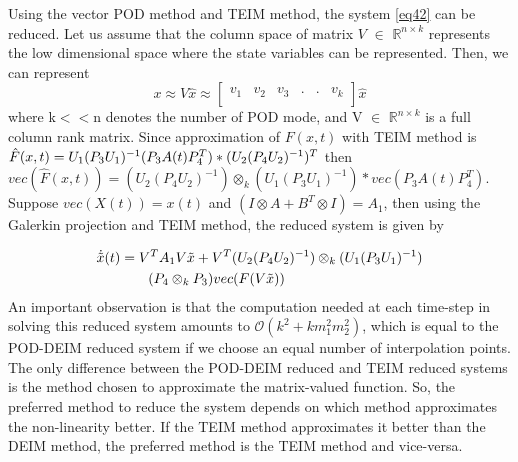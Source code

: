 \documentclass{article}
\begin{document}
Using the vector POD method \cite{Antoulas} and TEIM method, the system \eqref{eq42} can be reduced. Let us assume that the column space of matrix $V$ $\in$ $\mathbb{R}^{n \times k}$ represents the low dimensional space where the state variables can be represented. Then, we can represent 
\begin{equation} \label{eq3}
x \approx V\hat{x} \approx \begin{bmatrix}
v_1 & v_2 & v_3 &.&.& v_k\\
\end{bmatrix}\hat{x}
\end{equation}
where k$<<$n denotes the number of POD mode, and V $\in$ $\mathbb{R}^{n\times k}$ is a full column rank matrix. Since approximation of $F(x,t)$ with TEIM method is $\hat{F}(x,t)=U_1(P_3U_1)^{-1}\\(P_3A(t)P_4^T)*(U_2(P_4U_2)^{-1})^T$ then $vec(\hat{F}(x,t))=(U_2(P_4U_2)^{-1}) \otimes_k (U_1(P_3U_1)^{-1})* vec(P_3A(t)P_4^T)$. Suppose $vec(X(t))=x(t)$ and  $(I \otimes A + B^T \otimes I)=A_1$, then using the Galerkin projection and TEIM method, the reduced system is given by

\begin{equation}
    \begin{split}
        \Dot{\Tilde{x}}(t)&= V^TA_1V\Tilde{x}+V^T(U_2(P_4U_2)^{-1}) \otimes_k (U_1(P_3U_1)^{-1})\\
                      & \quad \quad(P_4 \otimes_k P_3)vec(F(V\Tilde{x}))
    \end{split}
\end{equation} 
An important observation is that the computation needed at each time-step in solving this reduced system amounts to $\mathcal{O}(k^2+km_1^2m_2^2)$, which is equal to the POD-DEIM reduced system if we choose an equal number of interpolation points. The only difference between the POD-DEIM reduced and TEIM reduced systems is the method chosen to approximate the matrix-valued function. So, the preferred method to reduce the system depends on which method approximates the non-linearity better. If the TEIM method approximates it better than the DEIM method, the preferred method is the TEIM method and vice-versa. 
\end{document}
